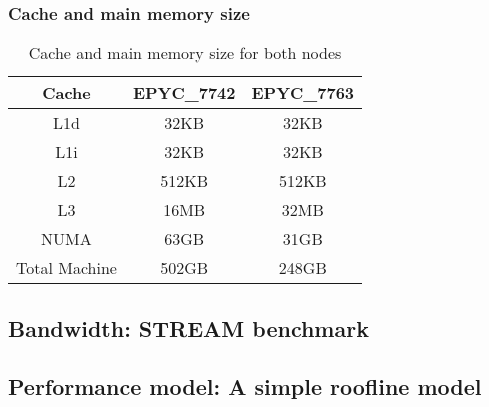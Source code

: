 \documentclass[unicode,11pt,a4paper,oneside,numbers=endperiod,openany]{scrartcl}
\begin{document}
\subsubsection{Cache and main memory size}


\begin{table}[h]
    \centering
    \begin{tabular}{|c|c|c|}
        \hline

        \textbf{Cache} & \textbf{EPYC\_7742} & \textbf{EPYC\_7763} \\
        \hline
        L1d            & 32KB                & 32KB                \\
        \hline
        L1i            & 32KB                & 32KB                \\
        \hline
        L2             & 512KB               & 512KB               \\
        \hline
        L3             & 16MB                & 32MB                \\
        \hline
        NUMA           & 63GB                & 31GB                \\
        \hline
        Total Machine  & 502GB               & 248GB               \\
        \hline
    \end{tabular}
    \caption{Cache and main memory size for both nodes}
    \label{tab:cache_main_memory}
\end{table}

\subsection{Bandwidth: STREAM benchmark}

\subsection{Performance model: A simple roofline model}
\end{document}
